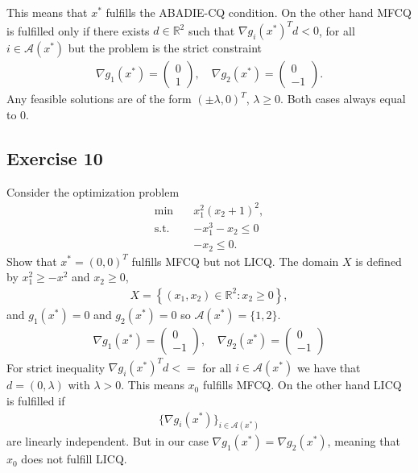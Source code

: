 This means that $x^{*}$ fulfills the ABADIE-CQ condition. On the other hand
MFCQ is fulfilled only if there exists $d\in\mathbb{R}^{2}$ such that $\nabla
g_i(x^{*})^{T}d < 0$, for all $i\in \mathcal{A}(x^{*})$ but the problem is the
strict constraint
\begin{align}
    \nabla g_1 (x^{*}) = \begin{pmatrix} 0 \\ 1 \end{pmatrix}, \quad
    \nabla g_2 (x^{*}) = \begin{pmatrix} 0 \\ -1 \end{pmatrix}.
\end{align}
Any feasible solutions are of the form $(\pm \lambda , 0)^{T}$, $\lambda \ge
0$. Both cases always equal to $0$.
\subsection{Exercise 10}
Consider the optimization problem
\begin{align}
    \text{min}\quad & x_1^{2}\left( x_2 + 1 \right)^{2} ,\\
    \text{s.t.}\quad &-x_1^{3} - x_2 \le 0\\
    & -x_2 \le 0.
\end{align}
Show that $x^{*} = (0, 0)^{T}$ fulfills MFCQ but not LICQ.
\newline
The domain $X$ is defined by $x_1^2 \ge -x^2$ and $x_2 \ge 0$,
\begin{align}
    X = \left\{ (x_1, x_2) \in \mathbb{R}^{2}: x_2 \ge 0 \right\},
\end{align}
and $g_1(x^{*}) = 0$ and $g_2(x^{*}) = 0$ so $\mathcal{A}(x^{*}) = \{1,2\}$.
\begin{align}
    \nabla g_1(x^{*}) = \begin{pmatrix} 0\\-1 \end{pmatrix},\quad \nabla
    g_2(x^{*}) = \begin{pmatrix} 0 \\ -1 \end{pmatrix}
\end{align}
For strict inequality $\nabla g_i(x^{*})^{T}d < =$ for all $i \in
\mathcal{A}(x^{*})$ we have that $d = (0, \lambda)$ with $\lambda > 0$. This
means $x_0$ fulfills MFCQ. On the other hand LICQ is fulfilled if
\begin{align}
    \{\nabla g_i(x^{*})\}_{i\in\mathcal{A}(x^{*})}
\end{align}
are linearly independent. But in our case $\nabla g_1(x^{*}) = \nabla
g_2(x^{*})$, meaning that $x_0$ does not fulfill LICQ.
